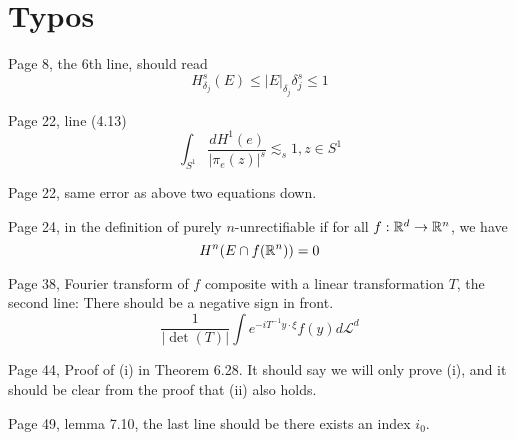 \chapter{Typos}
Page 8, the 6th line, should read 
\begin{equation*}
    H_{\delta_j}^s(E)\leq |E|_{\delta_j}\delta_j^s\leq 1
\end{equation*}


Page 22, line (4.13)
\begin{equation*}
    \int_{S^1}\frac{dH^1(e)}{|\pi_e(z)|^s}\lesssim_s 1, z\in S^1
\end{equation*}

Page 22, same error as above two equations down.

Page 24, in the definition of purely $n$-unrectifiable if for all $f:\mathbb{R}^d\to\mathbb{R}^n$, we have
\begin{equation*}
    H^n(E\cap f(\mathbb{R}^n))=0
\end{equation*}

Page 38, Fourier transform of $f$ composite with a linear transformation $T$, the second line: There should be a negative sign in front.
\begin{equation*}
    \frac{1}{|\det(T)|}\int e^{-iT^{-1}y\cdot\xi}f(y)d\mathcal{L}^d
\end{equation*}

Page 44, Proof of (i) in Theorem 6.28. It should say we will only prove (i), and it should be clear from the proof that (ii) also holds.

Page 49, lemma 7.10, the last line should be there exists an index $i_0$.

